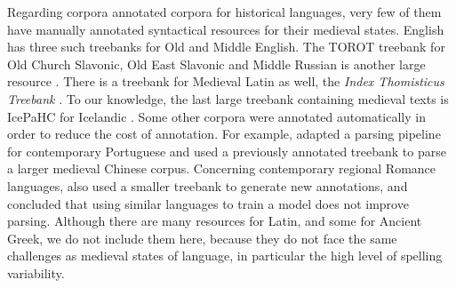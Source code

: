 Regarding corpora annotated corpora for historical languages, very few of them have manually annotated syntactical resources for their medieval states. English has three such treebanks \citep{oxford-2001-the,kroch-etal-2000-the,traugott-pintzuk-2008-coding} for Old and Middle English. The TOROT treebank for Old Church Slavonic, Old East Slavonic and Middle Russian is another large resource \citep{berdicevskis-eckhoff-2020-diachronic}. There is a treebank for Medieval Latin as well, the \emph{Index Thomisticus Treebank} \citep{passarotti-2019-project}. To our knowledge, the last large treebank containing medieval texts is IcePaHC for Icelandic \citep{rognvaldsson-etal-2012-icelandic}. Some other corpora were annotated automatically in order to reduce the cost of annotation. For example, \citet{rocio-etal-2003-automated} adapted a parsing pipeline for contemporary Portuguese and \citet{lee-kong-2014-a} used a previously annotated treebank \citep{lee-kong-2012-dependency} to parse a larger medieval Chinese corpus. Concerning contemporary regional Romance languages, \citet{miletic-etal-2020-building} also used a smaller treebank to generate new annotations, and concluded that using similar languages to train a model does not improve parsing. Although there are many resources for Latin, and some for Ancient Greek, we do not include them here, because they do not face the same challenges as medieval states of language, in particular the high level of spelling variability.
